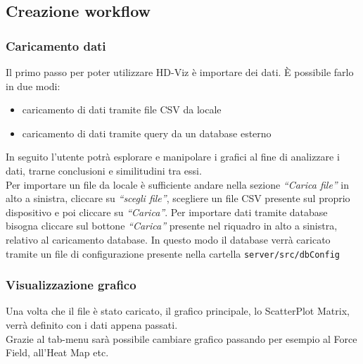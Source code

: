 \documentclass[../manuale_utente.tex]{subfiles}
\begin{document}
\subsection{Creazione workflow}
    \label{sub:crea_work}
\subsubsection{Caricamento dati}
    \label{subsub:carica_dati}

Il primo passo per poter utilizzare HD-Viz è importare dei dati. È possibile farlo in due modi:
\begin{itemize}
    \item caricamento di dati tramite file CSV da locale
    \item caricamento di dati tramite query da un database esterno
\end{itemize}
In seguito l’utente potrà esplorare e manipolare i grafici al fine di analizzare i dati, trarne conclusioni e similitudini tra essi. \\
Per importare un file da locale è sufficiente andare nella sezione \emph{“Carica file”}  in alto a sinistra, cliccare su \emph{“scegli file”}, scegliere un file CSV presente sul proprio dispositivo e poi cliccare su \emph{“Carica”}. 
Per importare dati tramite database bisogna cliccare sul bottone \emph{“Carica”} presente nel riquadro in alto a sinistra, relativo al caricamento database.
In questo modo il database verrà caricato tramite un file di configurazione presente nella cartella  \verb|server/src/dbConfig|

\subsubsection{Visualizzazione grafico}
    \label{subsub:vis_graf}
Una volta che il file è stato caricato, il grafico principale, lo ScatterPlot Matrix, verrà definito con i dati appena passati. \\
Grazie al tab-menu sarà possibile cambiare grafico passando per esempio al Force Field, all’Heat Map etc.
\end{document}

